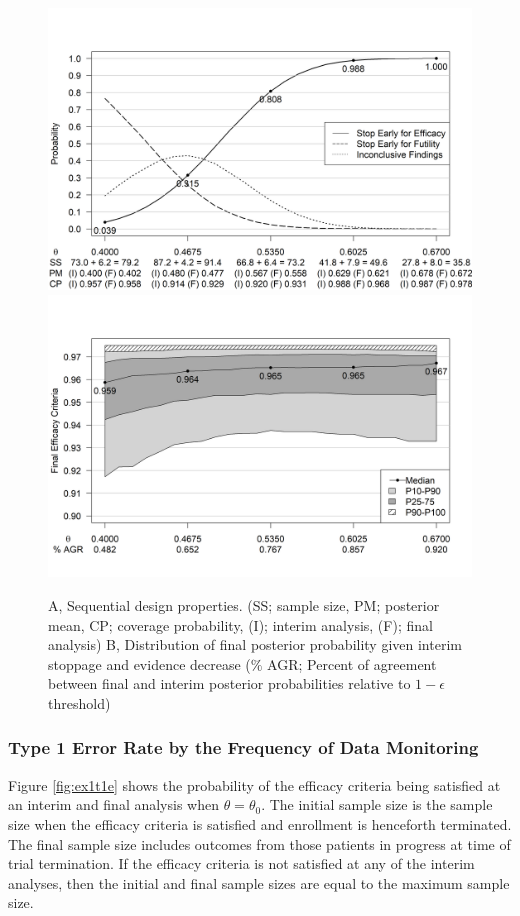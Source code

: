 \documentclass[useAMS,usenatbib,referee]{biom}
\begin{document}
\begin{figure}\begin{center}

    \includegraphics[width=6in]{../00-paper/FIGURES/figure3a.png}
    \includegraphics[width=6in]{../00-paper/FIGURES/figure3b.png}
    \caption{A, Sequential design properties. (SS; sample size, PM; posterior mean, CP; coverage probability, (I); interim analysis, (F); final analysis) B, Distribution of final posterior probability given interim stoppage and evidence decrease ($\%$ AGR; Percent of agreement between final and interim posterior probabilities relative to $1-\epsilon$ threshold)}
	\label{fig:ex1.1}

\end{center}
\end{figure}
\subsubsection{Type 1 Error Rate by the Frequency of Data Monitoring}
Figure \ref{fig:ex1t1e} shows the probability of the efficacy criteria being satisfied at an interim and final analysis when $\theta=\theta_0$. The initial sample size is the sample size when the efficacy criteria is satisfied and enrollment is henceforth terminated. The final sample size includes outcomes from those patients in progress at time of trial termination. If the efficacy criteria is not satisfied at any of the interim analyses, then the initial and final sample sizes are equal to the maximum sample size.
\end{document}
